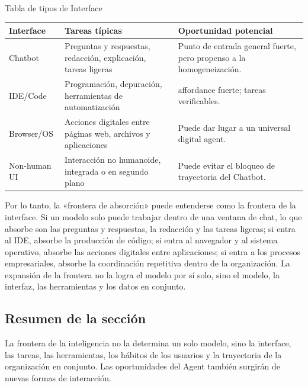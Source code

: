 \begin{knowledgebox}{Tabla de tipos de Interface}
\begin{tabularx}{\textwidth}{p{}p{}X}
\toprule
Interface & Tareas típicas & Oportunidad potencial \\
\midrule
Chatbot & Preguntas y respuestas, redacción, explicación, tareas ligeras & Punto de entrada general fuerte, pero propenso a la homogeneización. \\
IDE/Code & Programación, depuración, herramientas de automatización & affordance fuerte; tareas verificables. \\
Browser/OS & Acciones digitales entre páginas web, archivos y aplicaciones & Puede dar lugar a un universal digital agent. \\
Non-human UI & Interacción no humanoide, integrada o en segundo plano & Puede evitar el bloqueo de trayectoria del Chatbot. \\
\bottomrule
\end{tabularx}
\end{knowledgebox}

Por lo tanto, la «frontera de absorción» puede entenderse como la frontera de la interface. Si un modelo solo puede trabajar dentro de una ventana de chat, lo que absorbe son las preguntas y respuestas, la redacción y las tareas ligeras; si entra al IDE, absorbe la producción de código; si entra al navegador y al sistema operativo, absorbe las acciones digitales entre aplicaciones; si entra a los procesos empresariales, absorbe la coordinación repetitiva dentro de la organización. La expansión de la frontera no la logra el modelo por sí solo, sino el modelo, la interfaz, las herramientas y los datos en conjunto.

\subsection{Resumen de la sección}

La frontera de la inteligencia no la determina un solo modelo, sino la interface, las tareas, las herramientas, los hábitos de los usuarios y la trayectoria de la organización en conjunto. Las oportunidades del Agent también surgirán de nuevas formas de interacción.
